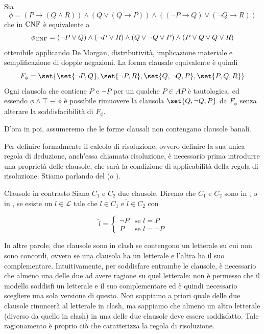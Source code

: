 \begin{example}{}
  Sia 
  \[\phi=(P\to(Q\land R))\land(Q\lor(Q\to P)) \land((\neg P \to Q)\lor(\neg Q \to R))\]
  che in \(\operatorname{CNF}\) è equivalente a
  \[\phi_{\operatorname{CNF}} = (\neg P\lor Q)\land(\neg P\lor R)\land(Q\lor \neg Q \lor P)\land(P\lor Q \lor Q \lor R)\]
  ottenibile applicando De Morgan, distributività, implicazione materiale e semplificazione di doppie negazioni.
  La forma clausale equivalente è quindi
  \[F_\phi = \set{\set{\neg P, Q},\set{\neg P, R},\set{Q, \neg Q, P},\set{P, Q, R}}\]
  Ogni clausola che contiene \(P\) e \(\neg P\) per un qualche \(P \in AP\) è tautologica, ed essendo \(\phi\land\top\equiv\phi\) è possibile rimuovere la clausola \(\set{Q, \neg Q, P}\) da \(F_\phi\) senza alterare la soddisfacibilità di \(F_\phi\).

  D'ora in poi, assumeremo che le forme clausali non contengano clausole banali.
\end{example}

Per definire formalmente il calcolo di risoluzione, ovvero definire la sua unica regola di deduzione, anch'essa chiamata risoluzione, è necessario prima introdurre una proprietà delle clausole, che sarà la condizione di applicabilità della regola di risoluzione. 
Stiamo parlando del  (o ).

\begin{definition}{Clausole in contrasto}
  Siano \(C_1\) e \(C_2\) due clausole. Diremo che \(C_1\) e \(C_2\) sono in , o in , se esiste un \(l \in \mathcal{L}\) tale che \(l \in C_1\) e \(\tilde{l} \in C_2\) con
  
  \[\tilde{l} = \begin{cases}
                \neg P & \text{se } l = P\\
                P & \text{se } l = \neg P
              \end{cases}
  \]
\end{definition}

In altre parole, due clausole sono in clash se contengono un letterale su cui non sono concordi, ovvero se una clausola ha un letterale e l'altra ha il suo complementare. 
Intuitivamente, per soddisfare entrambe le clausole, è necessario che almeno una delle due  ad avere ragione su quel letterale: non è permesso che il modello soddisfi un letterale e il suo complementare ed è quindi necessario scegliere una sola versione di questo.
Non sappiamo a priori quale delle due clausole rinuncerà al letterale in clash, ma sappiamo che almeno un altro letterale (diverso da quello in clash) in una delle due clausole deve essere soddisfatto.
Tale ragionamento è proprio ciò che caratterizza la regola di risoluzione.

